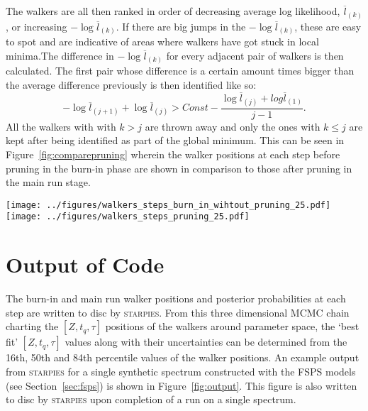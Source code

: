 \documentclass[useAMS,usenatbib]{mn2e}
\begin{document}
The walkers are all then ranked in order of decreasing average log likelihood, $\overline{l}_{(k)}$, or increasing $- \log \overline{l}_{(k)}$. If there are big jumps in the $- \log \overline{l}_{(k)}$, these are easy to spot and are indicative of areas where walkers have got stuck in local minima.The difference in $- \log \overline{l}_{(k)}$ for every adjacent pair of walkers is then calculated. The first pair whose difference is a certain amount times bigger than the average difference previously is then identified like so:
\begin{equation}
-\log \overline{l}_{(j+1)} + \log \overline{l}_{(j)} > Const − \frac{\log \overline{l}_{(j)} + log \overline{l}_{(1)}}{j - 1}.
\end{equation}
All the walkers with with $k>j$ are thrown away and only the ones with $k \leq j$ are kept after being identified as part of the global minimum. This can be seen in Figure~\ref{fig:comparepruning} wherein the walker positions at each step before pruning in the burn-in phase are shown in comparison to those after pruning in the main run stage.

\begin{figure*}
\centering
\texttt{[image: ../figures/walkers\_steps\_burn\_in\_wihtout\_pruning\_25.pdf]}
\texttt{[image: ../figures/walkers\_steps\_pruning\_25.pdf]}
\caption{The positions traced by the \emph{emcee} walkers with step number (i.e. time) in each of the $[Z, t_q, \tau]$ dimensions during the burn in phase before pruning (left) and the post burn-in phase after pruning (right). The red lines show the known true values in each panel. Walkers have got stuck in local minima (see Figure±\ref{fig:localminima}) but some have managed to find the global minimum which can be seen more clearly in the right hand panels.}
\label{fig:comparepruning}
\end{figure*}


\section{Output of Code}\label{sec:output}

The burn-in and main run walker positions and posterior probabilities at each step are written to disc by \textsc{starpies}. From this three dimensional MCMC chain charting the $[Z, t_q, \tau]$ positions of the walkers around parameter space, the `best fit' $[Z, t_q, \tau]$ values along with their uncertainties can be determined from the 16th, 50th and 84th percentile values of the walker positions. An example output from \textsc{starpies} for a single synthetic spectrum constructed with the FSPS models (see Section~\ref{sec:fsps}) is shown in Figure~\ref{fig:output}. This figure is also written to disc by \textsc{starpies} upon completion of a run on a single spectrum.  
\end{document}
